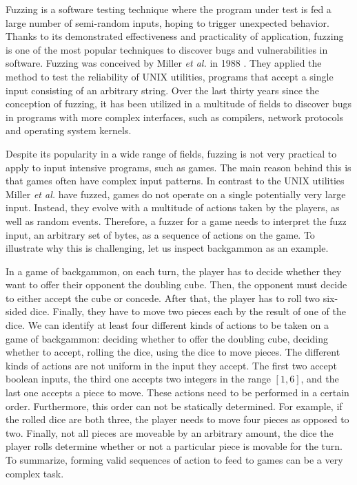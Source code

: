 Fuzzing is a software testing technique where the program under test is fed a large number of semi-random inputs, hoping to trigger unexpected behavior.
Thanks to its demonstrated effectiveness and practicality of application, fuzzing is one of the most popular techniques to discover bugs and vulnerabilities in software.
Fuzzing was conceived by Miller \textit{et al.} in 1988 \cite{Miller1999}.
They applied the method to test the reliability of UNIX utilities, programs that accept a single input consisting of an arbitrary string.
Over the last thirty years since the conception of fuzzing, it has been utilized in a multitude of fields to discover bugs in programs with more complex interfaces, such as compilers, network protocols and operating system kernels.

Despite its popularity in a wide range of fields, fuzzing is not very practical to apply to input intensive programs, such as games.
The main reason behind this is that games often have complex input patterns.
In contrast to the UNIX utilities Miller \textit{et al.} have fuzzed, games do not operate on a single potentially very large input.
Instead, they evolve with a multitude of actions taken by the players, as well as random events.
Therefore, a fuzzer for a game needs to interpret the fuzz input, an arbitrary set of bytes, as a sequence of actions on the game.
To illustrate why this is challenging, let us inspect backgammon as an example.

In a game of backgammon, on each turn, the player has to decide whether they want to offer their opponent the doubling cube.
Then, the opponent must decide to either accept the cube or concede.
After that, the player has to roll two six-sided dice.
Finally, they have to move two pieces each by the result of one of the dice.
We can identify at least four different kinds of actions to be taken on a game of backgammon: deciding whether to offer the doubling cube, deciding whether to accept, rolling the dice, using the dice to move pieces.
The different kinds of actions are not uniform in the input they accept.
The first two accept boolean inputs, the third one accepts two integers in the range $[1,6]$, and the last one accepts a piece to move.
These actions need to be performed in a certain order.
Furthermore, this order can not be statically determined.
For example, if the rolled dice are both three, the player needs to move four pieces as opposed to two.
Finally, not all pieces are moveable by an arbitrary amount, the dice the player rolls determine whether or not a particular piece is movable for the turn.
To summarize, forming valid sequences of action to feed to games can be a very complex task.

